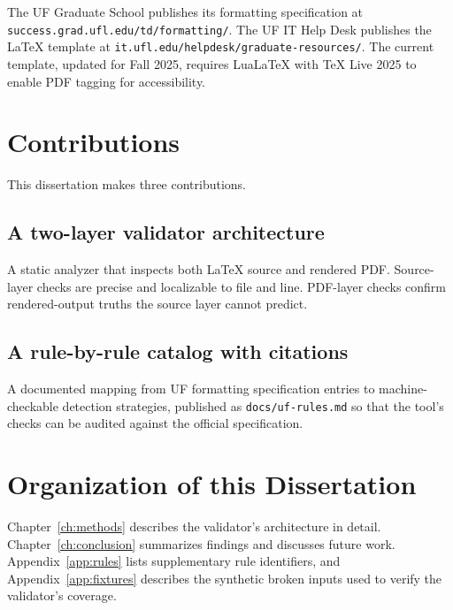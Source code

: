 The UF Graduate School publishes its formatting specification at
\texttt{success.grad.ufl.edu/td/formatting/}. The UF IT Help Desk
publishes the LaTeX template at
\texttt{it.ufl.edu/helpdesk/graduate-resources/}. The current template,
updated for Fall 2025, requires LuaLaTeX with TeX Live 2025 to enable
PDF tagging for accessibility.

\section{Contributions}

This dissertation makes three contributions.

\subsection{A two-layer validator architecture}

A static analyzer that inspects both LaTeX source and rendered PDF.
Source-layer checks are precise and localizable to file and line.
PDF-layer checks confirm rendered-output truths the source layer
cannot predict.

\subsection{A rule-by-rule catalog with citations}

A documented mapping from UF formatting specification entries to
machine-checkable detection strategies, published as
\texttt{docs/uf-rules.md} so that the tool's checks can be audited
against the official specification.

\section{Organization of this Dissertation}

Chapter~\ref{ch:methods} describes the validator's architecture in
detail. Chapter~\ref{ch:conclusion} summarizes findings and discusses
future work. Appendix~\ref{app:rules} lists supplementary rule
identifiers, and Appendix~\ref{app:fixtures} describes the synthetic
broken inputs used to verify the validator's coverage.
